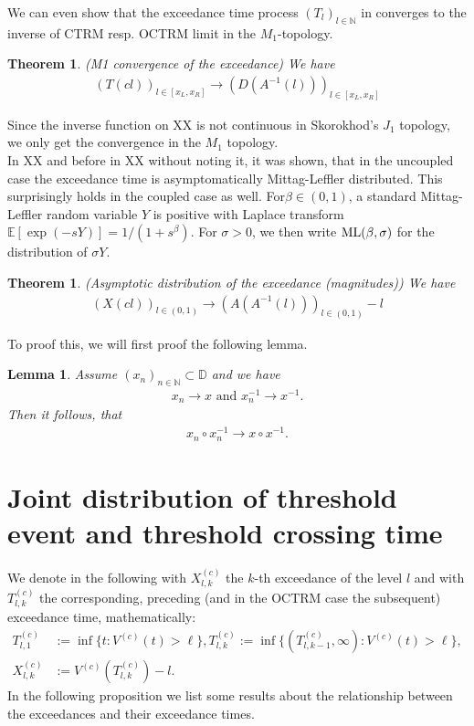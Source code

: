 \documentclass[12pt]{article}
\newtheorem{theorem}[equation]{Theorem}
\newtheorem{lemma}[equation]{Lemma}
\newcommand{\N}{\mathbb{N}}
\newcommand{\E}{\mathbb{E}}
\newcommand{\1}{\mathbf 1}
\newcommand{\D}{\mathbb{D}}
\begin{document}
We can even show that the exceedance time process $(T_l)_{l \in \N}$ in converges to the inverse of CTRM resp. OCTRM limit in the $M_1$-topology.


\begin{theorem}(M1 convergence of the exceedance)
We have 
\begin{align*}
(T(cl))_{l \in [x_L,x_R]}  \rightarrow (D(A^{-1}(l)))_{l \in [x_L,x_R]} 
\end{align*}
\end{theorem}
Since the inverse function on XX is not continuous in Skorokhod's $J_1$ topology, we only get the convergence in the $M_1$ topology.\\
In XX and before in XX without noting it, it was shown, that in the uncoupled case the exceedance time is asymptomatically Mittag-Leffler distributed. This surprisingly holds in the coupled case as well. For$\beta \in (0,1)$, a standard Mittag-Leffler 
random variable $Y$ is positive with Laplace transform
$\E[\exp(-s Y)] = 1/(1+s^\beta)$. For $\sigma > 0$, we then write 
${\rm ML}(\beta, \sigma)$ for the distribution of $\sigma Y$. \\


\begin{theorem}(Asymptotic distribution of the exceedance (magnitudes))
We have 
\begin{align*}
(X(cl))_{l \in (0,1)} \rightarrow (A(A^{-1}(l)))_{l \in (0,1)} - l
\end{align*}
\end{theorem}

To proof this, we will first proof the following lemma.

\begin{lemma} 
Assume $(x_n)_{n \in \N} \subset \D$ and we have
\begin{align*}
x_n \rightarrow x  \text{ and }  x_n^{-1} \rightarrow x^{-1}. 
\end{align*}
Then it follows, that
\begin{align*}
x_n \circ x_n^{-1} \rightarrow x \circ x^{-1}.
\end{align*}
\end{lemma}




\section{Joint distribution of threshold event and threshold crossing time}

We denote in the following with $X^{(c)}_{l,k}$ the $k$-th exceedance of the level $l$ and with $T^{(c)}_{l,k}$ the corresponding, preceding (and in the OCTRM case the subsequent) exceedance time, mathematically:
\begin{align*}
T^{(c)}_{l,1}&:=\inf\{t: V^{(c)}(t) > \ell\}, T^{(c)}_{l,k}:=\inf\{(T^{(c)}_{l,k-1},\infty): V^{(c)}(t) > \ell\}, \\
X^{(c)}_{l,k}&:=V^{(c)}(T^{(c)}_{l,k})-l.
\end{align*}
In the following proposition we list some results about the relationship between the exceedances and their exceedance times.
\end{document}
